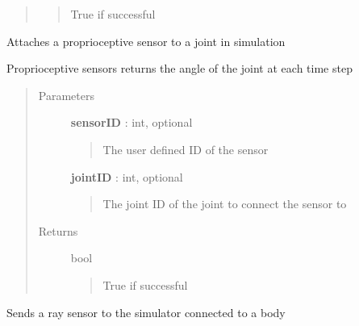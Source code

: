 \documentclass[letterpaper,10pt,english]{sphinxmanual}
\begin{document}
\begin{fulllineitems}
\begin{fulllineitems}
\begin{quote}
\begin{description}
\begin{quote}
True if successful
\end{quote}

\end{description}\end{quote}

\end{fulllineitems}


\begin{fulllineitems}
\label{code:pyrosim.PYROSIM.Send_Proprioceptive_Sensor}
Attaches a proprioceptive sensor to a joint in simulation

Proprioceptive sensors returns the angle of the joint at 
each time step
\begin{quote}\begin{description}
\item[{Parameters}] \leavevmode
\textbf{sensorID} : int, optional
\begin{quote}

The user defined ID of the sensor
\end{quote}

\textbf{jointID} : int, optional
\begin{quote}

The joint ID of the joint to connect the sensor to
\end{quote}

\item[{Returns}] \leavevmode
bool
\begin{quote}

True if successful
\end{quote}

\end{description}\end{quote}

\end{fulllineitems}


\begin{fulllineitems}
\label{code:pyrosim.PYROSIM.Send_Ray_Sensor}
Sends a ray sensor to the simulator connected to a body


\end{fulllineitems}
\end{fulllineitems}
\end{document}
